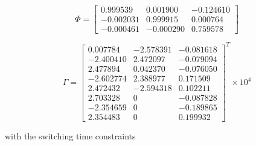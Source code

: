 \begin{equation}
    \Phi =
    \left[
    \begin{matrix}
       0.999539  &   0.001900 & -0.124610 \\
      -0.002031  &   0.999915 &  0.000764 \\
      -0.000461  &  -0.000290 &  0.759578
    \end{matrix}
    \right]
\end{equation}

\begin{equation}
    \Gamma =
    \left[
    \begin{matrix}
         0.007784  &  -2.578391  &  -0.081618 \\
        -2.400410  &   2.472097  &  -0.079094 \\
         2.477894  &   0.042370  &  -0.076050 \\
        -2.602774  &   2.388977  &   0.171509 \\
         2.472432  &  -2.594318  &   0.102211 \\
         2.703328  &       0     &  -0.087828 \\
        -2.354659  &       0     &  -0.189865 \\
         2.354483  &       0     &   0.199932
    \end{matrix}
    \right]^T
    \times 10^4
\end{equation}

\noindent
with the switching time constraints

